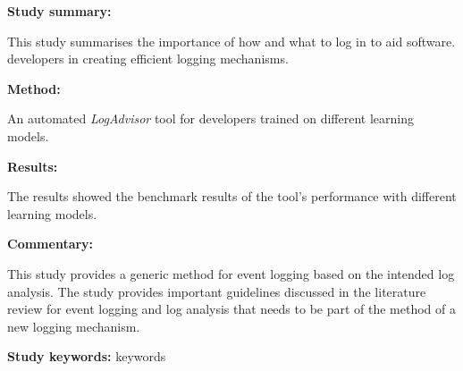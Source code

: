 \begin{tcolorbox}[colback=gray!5!white, colframe=pastelgreen!40!black, title=Learning to Log: Helping Developers Make Informed Logging Decisions \cite{Zhu2015}]
	\begin{minipage}[t]{0.25\textwidth}
		\textbf{Study summary:}
	\end{minipage}
	\hfill
	\begin{minipage}[t]{0.65\textwidth}
		This study summarises the importance of how and what to log in to aid software.
		developers in creating efficient logging mechanisms. 
	\end{minipage}

	\vspace{0.75em} 

	\begin{minipage}[t]{0.25\textwidth}
		\textbf{Method:}
	\end{minipage}
	\hfill
	\begin{minipage}[t]{0.65\textwidth}
		An automated \textit{LogAdvisor} tool for developers trained on different learning models.
	\end{minipage}

	\vspace{0.75em} 

	\begin{minipage}[t]{0.25\textwidth}
		\textbf{Results:}
	\end{minipage}
	\hfill
	\begin{minipage}[t]{0.65\textwidth}
		The results showed the benchmark results of the tool's performance with different learning models.
	\end{minipage}

	\vspace{0.75em} 

	\begin{minipage}[t]{0.25\textwidth}
		\textbf{Commentary:}
	\end{minipage}
	\hfill
	\begin{minipage}[t]{0.65\textwidth}
		This study provides a generic method for event logging based on the intended log analysis.
		The study provides important guidelines discussed in the literature review for event logging
		and log analysis that needs to be part of the method of a new logging mechanism.
	\end{minipage}
	\tcblower
	\textbf{Study keywords:} keywords
\end{tcolorbox}

